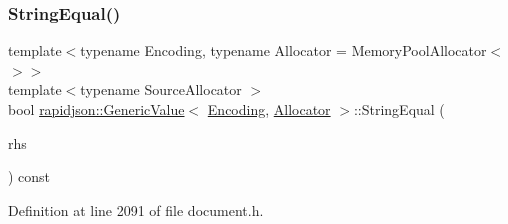 \mbox{\label{classrapidjson_1_1_generic_value_a19e954a8f4731fea785abe0defa0ac44}} 
\subsubsection{\texorpdfstring{StringEqual()}{StringEqual()}}
{\footnotesize\ttfamily template$<$typename Encoding, typename Allocator = Memory\+Pool\+Allocator$<$$>$$>$ \\
template$<$typename Source\+Allocator $>$ \\
bool \mbox{\hyperlink{classrapidjson_1_1_generic_value}{rapidjson\+::\+Generic\+Value}}$<$ \mbox{\hyperlink{classrapidjson_1_1_encoding}{Encoding}}, \mbox{\hyperlink{classrapidjson_1_1_allocator}{Allocator}} $>$\+::String\+Equal (\begin{DoxyParamCaption}\item[{const \mbox{\hyperlink{classrapidjson_1_1_generic_value}{Generic\+Value}}$<$ \mbox{\hyperlink{classrapidjson_1_1_encoding}{Encoding}}, Source\+Allocator $>$ \&}]{rhs }\end{DoxyParamCaption}) const}



Definition at line 2091 of file document.\+h.


